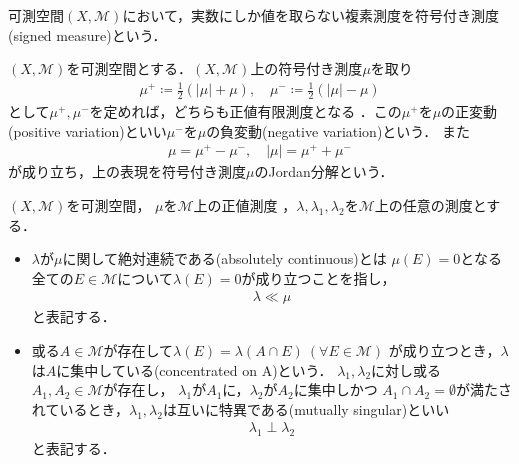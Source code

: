 	可測空間$(X,\mathcal{M})$において，実数にしか値を取らない複素測度を符号付き測度(signed measure)という．
	\begin{itembox}[l]{}
		\begin{dfn}
			$(X,\mathcal{M})$を可測空間とする．$(X,\mathcal{M})$上の符号付き測度$\mu$を取り
			\begin{align}
				\mu^+ \coloneqq \frac{1}{2}(|\mu| + \mu) , \quad \mu^- \coloneqq \frac{1}{2}(|\mu| - \mu)
			\end{align}
			として$\mu^+,\mu^-$を定めれば，どちらも正値有限測度となる\footnotemark
			．この$\mu^+$を$\mu$の正変動(positive variation)といい$\mu^-$を$\mu$の負変動(negative variation)という．
			また
			\begin{align}
				\mu = \mu^+ - \mu^-, \quad |\mu| = \mu^+ + \mu^-
			\end{align}
			が成り立ち，上の表現を符号付き測度$\mu$のJordan分解という．
		\end{dfn}
	\end{itembox}
	
	
	\begin{itembox}[l]{}
		\begin{dfn}[絶対連続・特異]
			$(X,\mathcal{M})$を可測空間，
			$\mu$を$\mathcal{M}$上の正値測度\footnotemark
			，$\lambda,\lambda_1,\lambda_2$を$\mathcal{M}$上の任意の測度とする．
			\begin{itemize}
				\item $\lambda$が$\mu$に関して絶対連続である(absolutely continuous)とは
					$\mu(E)=0$となる全ての$E \in \mathcal{M}$について$\lambda(E)=0$が成り立つことを指し，
					\begin{align}
						\lambda \ll \mu
					\end{align}
					と表記する．
				
				\item 或る$A \in \mathcal{M}$が存在して$\lambda(E) = \lambda(A \cap E)\ (\forall E \in \mathcal{M})$
					が成り立つとき，$\lambda$は$A$に集中している(concentrated on A)という．
					$\lambda_1,\lambda_2$に対し或る$A_1,A_2 \in \mathcal{M}$が存在し，
					$\lambda_1$が$A_1$に，$\lambda_2$が$A_2$に集中しかつ
					$A_1 \cap A_2 = \emptyset$が満たされているとき，$\lambda_1,\lambda_2$は互いに特異である(mutually singular)といい
					\begin{align}
						\lambda_1 \perp \lambda_2
					\end{align}
					と表記する．
			\end{itemize}
		\end{dfn}
	\end{itembox}
	

